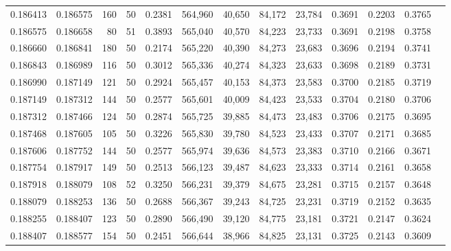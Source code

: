 \begin{tabular}{rrrrrrrrrrrrr}
0.186413 & 0.186575 &   160 &  50 &                                     0.2381 & 564,960 &  40,650 &  84,172 &  23,784 & 0.3691 & 0.2203 & 0.3765 \\
0.186575 & 0.186658 &    80 &  51 &                                     0.3893 & 565,040 &  40,570 &  84,223 &  23,733 & 0.3691 & 0.2198 & 0.3758 \\
0.186660 & 0.186841 &   180 &  50 &                                     0.2174 & 565,220 &  40,390 &  84,273 &  23,683 & 0.3696 & 0.2194 & 0.3741 \\
0.186843 & 0.186989 &   116 &  50 &                                     0.3012 & 565,336 &  40,274 &  84,323 &  23,633 & 0.3698 & 0.2189 & 0.3731 \\
0.186990 & 0.187149 &   121 &  50 &                                     0.2924 & 565,457 &  40,153 &  84,373 &  23,583 & 0.3700 & 0.2185 & 0.3719 \\
0.187149 & 0.187312 &   144 &  50 &                                     0.2577 & 565,601 &  40,009 &  84,423 &  23,533 & 0.3704 & 0.2180 & 0.3706 \\
0.187312 & 0.187466 &   124 &  50 &                                     0.2874 & 565,725 &  39,885 &  84,473 &  23,483 & 0.3706 & 0.2175 & 0.3695 \\
0.187468 & 0.187605 &   105 &  50 &                                     0.3226 & 565,830 &  39,780 &  84,523 &  23,433 & 0.3707 & 0.2171 & 0.3685 \\
0.187606 & 0.187752 &   144 &  50 &                                     0.2577 & 565,974 &  39,636 &  84,573 &  23,383 & 0.3710 & 0.2166 & 0.3671 \\
0.187754 & 0.187917 &   149 &  50 &                                     0.2513 & 566,123 &  39,487 &  84,623 &  23,333 & 0.3714 & 0.2161 & 0.3658 \\
0.187918 & 0.188079 &   108 &  52 &                                     0.3250 & 566,231 &  39,379 &  84,675 &  23,281 & 0.3715 & 0.2157 & 0.3648 \\
0.188079 & 0.188253 &   136 &  50 &                                     0.2688 & 566,367 &  39,243 &  84,725 &  23,231 & 0.3719 & 0.2152 & 0.3635 \\
0.188255 & 0.188407 &   123 &  50 &                                     0.2890 & 566,490 &  39,120 &  84,775 &  23,181 & 0.3721 & 0.2147 & 0.3624 \\
0.188407 & 0.188577 &   154 &  50 &                                     0.2451 & 566,644 &  38,966 &  84,825 &  23,131 & 0.3725 & 0.2143 & 0.3609 \\

\end{tabular}
